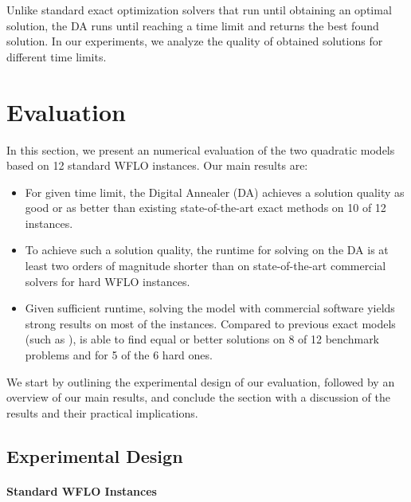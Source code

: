 \documentclass[preprint,12pt]{elsarticle}
\newcommand{\todo}[1]{{\textcolor{red}{\bf {#1}}}}
\newcommand{\qcls}{{\sf {\small QC-LS\xspace}}}
\newcommand{\quls}{{\sf {\small QU-LS\xspace}}}
\newcommand{\qcss}{{\sf {\small QC-SS\xspace}}}
\newcommand{\qcssgrb}{{\sf {\small QC-SS(GRB)\xspace}}}
\begin{document}
Unlike %
standard exact optimization solvers that run until obtaining an optimal solution, the DA runs until reaching a time limit and returns the best found solution.  In our experiments, we analyze the quality of obtained solutions for different time limits.


\section{Evaluation}
\label{sec:eval}

In this section, we 
present an numerical evaluation of the two quadratic models based on 
12 standard WFLO instances.
Our main results are: \begin{itemize}
	\item For given time limit, the Digital Annealer (DA) achieves a solution quality as good or as better than existing state-of-the-art exact methods on 10 of 12 instances.
		\item To achieve such a solution quality, the runtime for solving \quls{} on the DA is at least two orders of magnitude shorter than \qcls{} on state-of-the-art commercial solvers for hard WFLO instances.  
	\item Given sufficient runtime, solving the \qcls{} model with commercial software yields strong results on most of the instances. Compared to previous exact models (such as \qcss), \qcls{} is able to find equal or better solutions on 8 of 12 benchmark problems and for 5 of the 6 hard ones. %
\end{itemize}

We start by outlining the experimental design of our evaluation, followed by an overview of our main results,
and conclude the section with a discussion of the results and their practical implications.

\subsection{Experimental Design}



\paragraph{Standard WFLO Instances}
\end{document}
